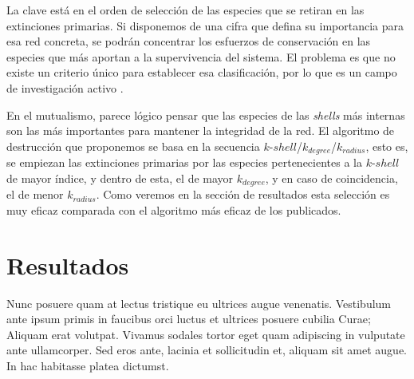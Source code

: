 La clave está en el orden de selección de las especies que se retiran en las extinciones primarias. Si disponemos de una cifra que defina su importancia para esa red concreta, se podrán concentrar los esfuerzos de conservación en las especies que más aportan a la supervivencia del sistema. El problema es que no existe un criterio único para establecer esa clasificación, por lo que es un campo de investigación activo \citep{dominguez2015ranking}.

En el mutualismo, parece lógico pensar que las especies de las \textit{shells} más internas son las más importantes para mantener la integridad de la red. El algoritmo de destrucción que proponemos se basa en la secuencia $k$-$shell$/$k_{degree}$/$k_{radius}$, esto es, se empiezan las extinciones primarias por las especies pertenecientes a la $k$-$shell$ de mayor índice, y dentro de esta, el de mayor $k_{degree}$, y en caso de coincidencia, el de menor $k_{radius}$. Como veremos en la sección de resultados esta selección es muy eficaz comparada con el algoritmo más eficaz de los publicados. 


\section{Resultados}

Nunc posuere quam at lectus tristique eu ultrices augue venenatis. Vestibulum ante ipsum primis in faucibus orci luctus et ultrices posuere cubilia Curae; Aliquam erat volutpat. Vivamus sodales tortor eget quam adipiscing in vulputate ante ullamcorper. Sed eros ante, lacinia et sollicitudin et, aliquam sit amet augue. In hac habitasse platea dictumst.

